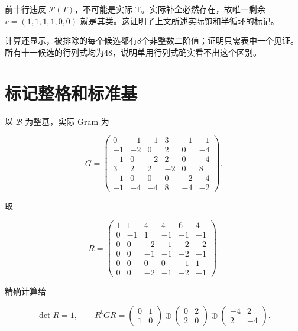 \documentclass[11pt,a4paper,oneside]{ctexrep}
\theoremstyle{cnplain}
\theoremstyle{definition}
\theoremstyle{remark}
\begin{document}
前十行违反 \(\mathcal P(T)\)，不可能是实际 T。实际补全必然存在，故唯一剩余 \(v=(1,1,1,1,0,0)\) 就是其类。这证明了上文所述实际饱和半循环的标记。

计算还显示，被排除的每个候选都有8个非整数二阶值；证明只需表中一个见证。所有十一候选的行列式均为48，说明单用行列式确实看不出这个区别。

\section{标记整格和标准基}\label{sec:lattice:4}

以 \(\mathcal B\) 为整基，实际 Gram 为

\begin{equation}
G=
\begin{pmatrix}
0&-1&-1&3&-1&-1\\
-1&-2&0&2&0&-4\\
-1&0&-2&2&0&-4\\
3&2&2&-2&0&8\\
-1&0&0&0&-2&-4\\
-1&-4&-4&8&-4&-2
\end{pmatrix}.                                                   \label{eq:lattice:6}
\end{equation}

取

\begin{equation}
R=\begin{pmatrix}
1&1&4&4&6&4\\
0&-1&1&-1&-1&-1\\
0&0&-2&-1&-2&-2\\
0&0&-1&-1&-2&-1\\
0&0&0&0&-1&1\\
0&0&-2&-1&-2&-1
\end{pmatrix}.
\end{equation}

精确计算给

\begin{equation}
\det R=1,\qquad
 R^{\mathsf t}GR=
 \begin{pmatrix}0&1\\1&0\end{pmatrix}
 \oplus\begin{pmatrix}0&2\\2&0\end{pmatrix}
 \oplus\begin{pmatrix}-4&2\\2&-4\end{pmatrix}.                       \label{eq:lattice:7}
\end{equation}
\end{document}
